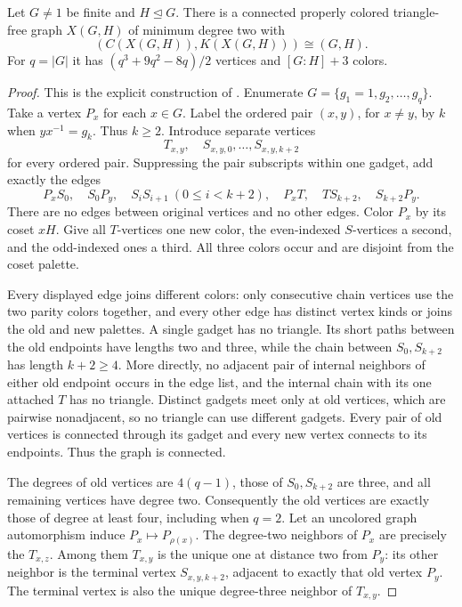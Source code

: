 \begin{theorem}\label{R.PairEncoding}
Let $G\ne1$ be finite and $H\mathrel{\trianglelefteq}G$. There is a connected
properly colored triangle-free graph $X(G,H)$ of minimum degree two with
\[
 (C(X(G,H)),K(X(G,H)))\cong(G,H).
\]
For $q=|G|$ it has $(q^3+9q^2-8q)/2$ vertices and $[G:H]+3$ colors.
\end{theorem}
\begin{proof}
This is the explicit construction of \cite[Theorem 3.1]{DMV}.
Enumerate $G=\{g_1=1,g_2,\ldots,g_q\}$. Take a vertex $P_x$ for each
$x\in G$. Label the ordered pair $(x,y)$, for $x\ne y$, by $k$ when
$yx^{-1}=g_k$. Thus $k\geq2$. Introduce separate vertices
\[
 T_{x,y},\quad S_{x,y,0},\ldots,S_{x,y,k+2}
\]
for every ordered pair. Suppressing the pair subscripts within one gadget,
add exactly the edges
\begin{equation}\label{eq:arrow}
 P_xS_0,\quad S_0P_y,\quad
 S_iS_{i+1}\ (0\leq i<k+2),\quad
 P_xT,\quad TS_{k+2},\quad S_{k+2}P_y.
\end{equation}
There are no edges between original vertices and no other edges. Color $P_x$
by its coset $xH$. Give all $T$-vertices one new color, the even-indexed
$S$-vertices a second, and the odd-indexed ones a third. All three colors
occur and are disjoint from the coset palette.

Every displayed edge joins different colors: only consecutive chain vertices
use the two parity colors together, and every other edge has distinct vertex
kinds or joins the old and new palettes. A single gadget has no triangle.
Its short paths between the old endpoints have lengths two and three, while
the chain between $S_0,S_{k+2}$ has length $k+2\geq4$. More directly, no
adjacent pair of internal neighbors of either old endpoint occurs in the
edge list, and the internal chain with its one attached $T$ has no triangle.
Distinct gadgets meet only at old vertices, which are pairwise nonadjacent,
so no triangle can use different gadgets. Every pair of old vertices is
connected through its gadget and every new vertex connects to its endpoints.
Thus the graph is connected.

The degrees of old vertices are $4(q-1)$, those of $S_0,S_{k+2}$ are three,
and all remaining vertices have degree two. Consequently the old vertices
are exactly those of degree at least four, including when $q=2$.
Let an uncolored graph automorphism induce $P_x\mapsto P_{\rho(x)}$.
The degree-two neighbors of $P_x$ are precisely the $T_{x,z}$.
Among them $T_{x,y}$ is the unique one at distance two from $P_y$: its other
neighbor is the terminal vertex $S_{x,y,k+2}$, adjacent to exactly that old
vertex $P_y$. The terminal vertex is also the unique degree-three neighbor
of $T_{x,y}$.


\end{proof}
